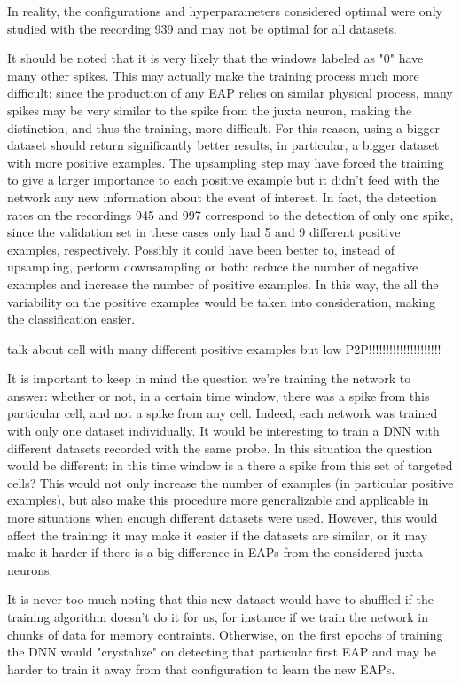 In reality, the configurations and hyperparameters considered optimal were only studied with the recording 939 and may not be optimal for all datasets.

It should be noted that it is very likely that the windows labeled as "0" have many other spikes. This may actually make the training process much more difficult: since the production of any EAP relies on similar physical process, many spikes may be very similar to the spike from the juxta neuron, making the distinction, and thus the training, more difficult. For this reason, using a bigger dataset should return significantly better results, in particular, a bigger dataset with more positive examples. The upsampling step may have forced the training to give a larger importance to each positive example but it didn't feed with the network any new information about the event of interest. In fact, the detection rates on the recordings 945 and 997 correspond to the detection of only one spike, since the validation set in these cases only had 5 and 9 different positive examples, respectively. Possibly it could have been better to, instead of upsampling, perform downsampling or both: reduce the number of negative examples and increase the number of positive examples. In this way, the all the variability on the positive examples would be taken into consideration, making the classification easier.

talk about cell with many different positive examples but low P2P!!!!!!!!!!!!!!!!!!!!!

It is important to keep in mind the question we're training the network to answer: whether or not, in a certain time window, there was a spike from this particular cell, and not a spike from any cell. Indeed, each network was trained with only one dataset individually. It would be interesting to train a DNN with different datasets recorded with the same probe. In this situation the question would be different: in this time window is a there a spike from this set of targeted cells? This would not only increase the number of examples (in particular positive examples), but also make this procedure more generalizable and applicable in more situations when enough different datasets were used. However, this would affect the training: it may make it easier if the datasets are similar, or it may make it harder if there is a big difference in  EAPs from the considered juxta neurons. 

It is never too much noting that this new dataset would have to shuffled if the training algorithm doesn't do it for us, for instance if we train the network in chunks of data for memory contraints. Otherwise, on the first epochs of training the DNN would "crystalize" on detecting that particular first EAP and may be harder to train it away from that configuration to learn the new EAPs.

